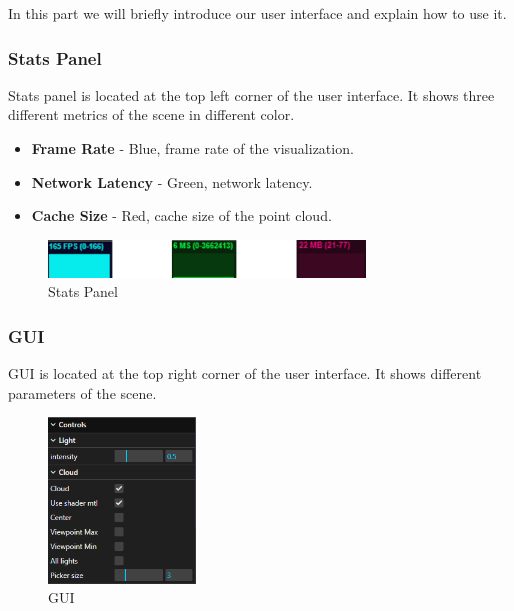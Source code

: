 \documentclass[11pt, a4paper,oneside,chapterprefix=false]{scrbook}
\begin{document}
In this part we will briefly introduce our user interface and explain how to use it.

\subsubsection{Stats Panel}

Stats panel is located at the top left corner of the user interface. It shows three different metrics of the scene in different color.

\begin{itemize}
	\item \textbf{Frame Rate} - Blue, frame rate of the visualization.
	\item \textbf{Network Latency} - Green, network latency.
	\item \textbf{Cache Size} - Red, cache size of the point cloud.
\end{itemize}



\begin{minipage}{\textwidth}
	\begin{figure}[H]
        \centering
        \includegraphics*[width=0.75\textwidth]{figures/stats panel.png}
        \caption{Stats Panel}
        \label{fig:stats panel}
    \end{figure}
\end{minipage}

\subsubsection{GUI}

GUI is located at the top right corner of the user interface. It shows different parameters of the scene.

\begin{minipage}{\textwidth}
	\begin{figure}[H]
		\centering
		\includegraphics*[width=0.35\textwidth]{figures/GUI.png}
		\caption{GUI}
		\label{fig:gui}
	\end{figure}
\end{minipage}
\end{document}
